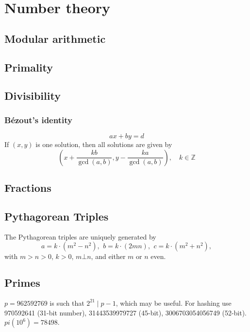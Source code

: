 \chapter{Number theory}

\section{Modular arithmetic}

\section{Primality}

\section{Divisibility}

	\subsection{Bézout's identity}
	$$ax+by=d$$
	If $(x,y)$ is one solution, then all solutions are given by
	$$\left(x+\frac{kb}{\gcd(a,b)}, y-\frac{ka}{\gcd(a,b)}\right), \quad k\in\mathbb{Z}$$


\section{Fractions}

\section{Pythagorean Triples}
 The Pythagorean triples are uniquely generated by
 \[ a=k\cdot (m^{2}-n^{2}),\ \,b=k\cdot (2mn),\ \,c=k\cdot (m^{2}+n^{2}), \]
 with $m > n > 0$, $k > 0$, $m \bot n$, and either $m$ or $n$ even.

\section{Primes}
	$p=962592769$ is such that $2^{21} \mid p-1$, which may be useful. For hashing
	use 970592641 (31-bit number), 31443539979727 (45-bit), 3006703054056749
	(52-bit). $pi(10^6) = 78498$.

